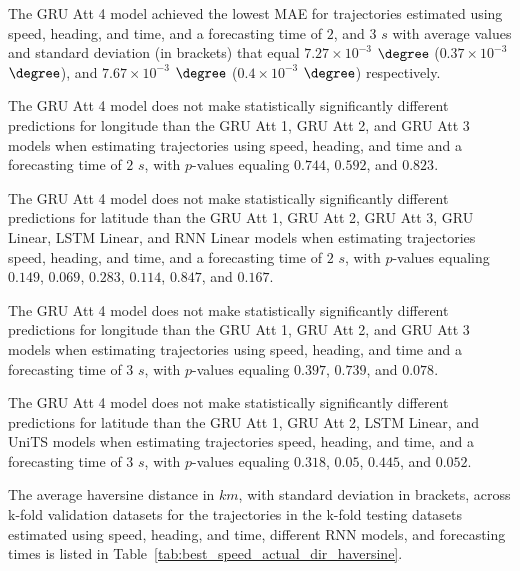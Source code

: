 The GRU Att 4 model achieved the lowest MAE for trajectories estimated using speed, heading, and time, and a forecasting time of $2$, and $3$ $s$ with average values and standard deviation (in brackets) that equal $7.27 \times 10^{-3}$ $\degree$ ($0.37 \times 10^{-3}$ $\degree$), and $7.67 \times 10^{-3}$ $\degree$ ($0.4 \times 10^{-3}$ $\degree$) respectively.

The GRU Att 4 model does not make statistically significantly different predictions for longitude than the GRU Att 1, GRU Att 2, and GRU Att 3 models when estimating trajectories using speed, heading, and time and a forecasting time of $2$ $s$, with $p$-values equaling $0.744$, $0.592$, and $0.823$.

The GRU Att 4 model does not make statistically significantly different predictions for latitude than the GRU Att 1, GRU Att 2, GRU Att 3, GRU Linear, LSTM Linear, and RNN Linear models when estimating trajectories speed, heading, and time, and a forecasting time of $2$ $s$, with $p$-values equaling $0.149$, $0.069$, $0.283$, $0.114$, $0.847$, and $0.167$.

The GRU Att 4 model does not make statistically significantly different predictions for longitude than the GRU Att 1, GRU Att 2, and GRU Att 3 models when estimating trajectories using speed, heading, and time and a forecasting time of $3$ $s$, with $p$-values equaling $0.397$, $0.739$, and $0.078$.

The GRU Att 4 model does not make statistically significantly different predictions for latitude than the GRU Att 1, GRU Att 2, LSTM Linear, and UniTS models when estimating trajectories speed, heading, and time, and a forecasting time of $3$ $s$, with $p$-values equaling $0.318$, $0.05$, $0.445$, and $0.052$.

The average haversine distance in $km$, with standard deviation in brackets, across k-fold validation datasets for the trajectories in the k-fold testing datasets estimated using speed, heading, and time, different RNN models, and forecasting times is listed in Table~\ref{tab:best_speed_actual_dir_haversine}.

